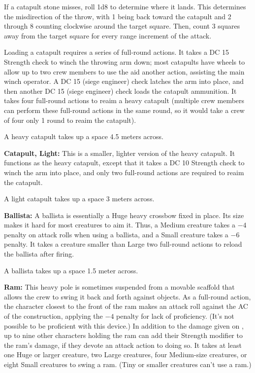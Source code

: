 If a catapult stone misses, roll 1d8 to determine where it lands. This determines the misdirection of the throw, with 1 being back toward the catapult and 2 through 8 counting clockwise around the target square. Then, count 3 squares away from the target square for every range increment of the attack.

Loading a catapult requires a series of full-round actions. It takes a DC 15 Strength check to winch the throwing arm down; most catapults have wheels to allow up to two crew members to use the aid another action, assisting the main winch operator. A DC 15  (siege engineer) check latches the arm into place, and then another DC 15  (siege engineer) check loads the catapult ammunition. It takes four full-round actions to reaim a heavy catapult (multiple crew members can perform these full-round actions in the same round, so it would take a crew of four only 1 round to reaim the catapult).

A heavy catapult takes up a space 4.5 meters across.

\textbf{Catapult, Light:} This is a smaller, lighter version of the heavy catapult. It functions as the heavy catapult, except that it takes a DC 10 Strength check to winch the arm into place, and only two full-round actions are required to reaim the catapult.

A light catapult takes up a space 3 meters across.

\textbf{Ballista:} A ballista is essentially a Huge heavy crossbow fixed in place. Its size makes it hard for most creatures to aim it. Thus, a Medium creature takes a $-4$ penalty on attack rolls when using a ballista, and a Small creature takes a $-6$ penalty. It takes a creature smaller than Large two full-round actions to reload the ballista after firing.

A ballista takes up a space 1.5 meter across.

\textbf{Ram:} This heavy pole is sometimes suspended from a movable scaffold that allows the crew to swing it back and forth against objects. As a full-round action, the character closest to the front of the ram makes an attack roll against the AC of the construction, applying the $-4$ penalty for lack of proficiency. (It's not possible to be proficient with this device.) In addition to the damage given on , up to nine other characters holding the ram can add their Strength modifier to the ram's damage, if they devote an attack action to doing so. It takes at least one Huge or larger creature, two Large creatures, four Medium-size creatures, or eight Small creatures to swing a ram. (Tiny or smaller creatures can't use a ram.)

